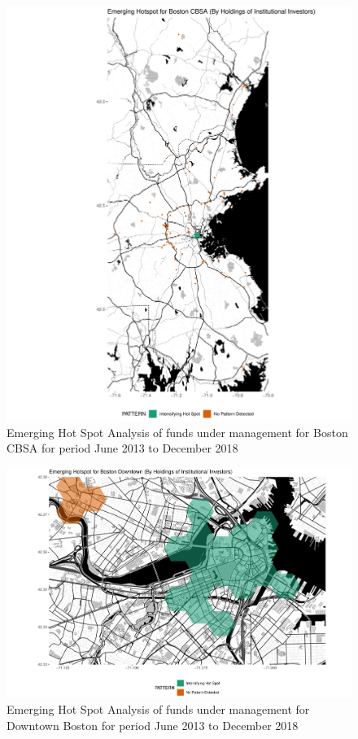 \begin{figure}
	\centering
	\includegraphics[width=1\linewidth]{Figures/ChapterIV/Bos_Money_EH}
	\caption[Emerging Hot Spot Analysis of Funds Under Management for Boston CBSA 2013-2018]{Emerging Hot Spot Analysis of funds under management for Boston CBSA for period June 2013 to December 2018}
	\label{fig:bostonmoneyhotspot}
\end{figure}

\begin{figure}
	\centering
	\includegraphics[width=1\linewidth]{Figures/ChapterIV/Bos_Money_EH_Downtown}
	\caption[Emerging Hot Spot Analysis of Funds Under Management for Downtown Boston 2013-2018]{Emerging Hot Spot Analysis of funds under management for Downtown Boston for period June 2013 to December 2018}
	\label{fig:bostonmoneyhotspot_Downtown}
\end{figure}


